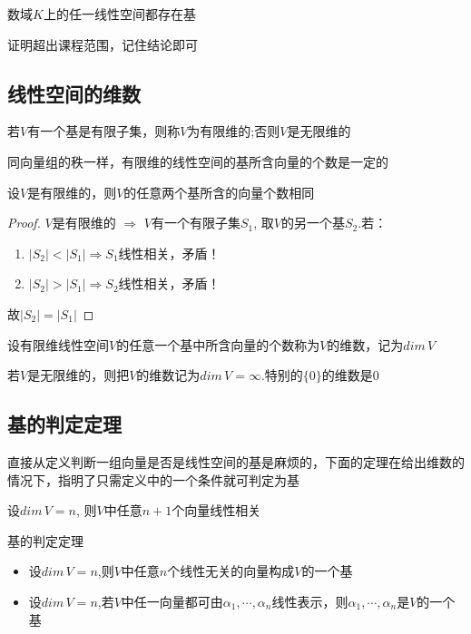 \begin{theorem}[基存在定理]
    数域$K$上的任一线性空间都存在基
\end{theorem}
证明超出课程范围，记住结论即可

\subsection*{线性空间的维数}
\begin{definition}
    若$V$有一个基是有限子集，则称$V$为有限维的;否则$V$是无限维的
\end{definition}

同向量组的秩一样，有限维的线性空间的基所含向量的个数是一定的
\begin{theorem}
    设$V$是有限维的，则$V$的任意两个基所含的向量个数相同
\end{theorem}

\begin{proof}
    $V$是有限维的 $\Rightarrow$ $V$有一个有限子集$S_1$, 取$V$的另一个基$S_2$.若：
    \begin{enumerate}
        \item $|S_2| < |S_1| \Rightarrow S_1$线性相关，矛盾！
        \item $|S_2| > |S_1| \Rightarrow S_2$线性相关，矛盾！
    \end{enumerate}
    故$|S_2| = |S_1|$
\end{proof}

\begin{definition}[维数]
    设有限维线性空间$V$的任意一个基中所含向量的个数称为$V$的维数，记为$dim\, V$
\end{definition}
若$V$是无限维的，则把$V$的维数记为$dim\,V=\infty$.特别的$\{0\}$的维数是$0$

\subsection*{基的判定定理}
直接从定义判断一组向量是否是线性空间的基是麻烦的，下面的定理在给出维数的情况下，指明了只需定义中的一个条件就可判定为基

\begin{lemma}
    设$dim\,V = n$, 则$V$中任意$n+1$个向量线性相关
\end{lemma}

\begin{theorem}基的判定定理
    \begin{itemize}
        \item 设$dim\,V = n$,则$V$中任意$n$个线性无关的向量构成$V$的一个基
        \item 设$dim\,V = n$,若$V$中任一向量都可由$\alpha_1, \cdots, \alpha_n$线性表示，则$\alpha_1, \cdots, \alpha_n$是$V$的一个基
    \end{itemize}
\end{theorem}

